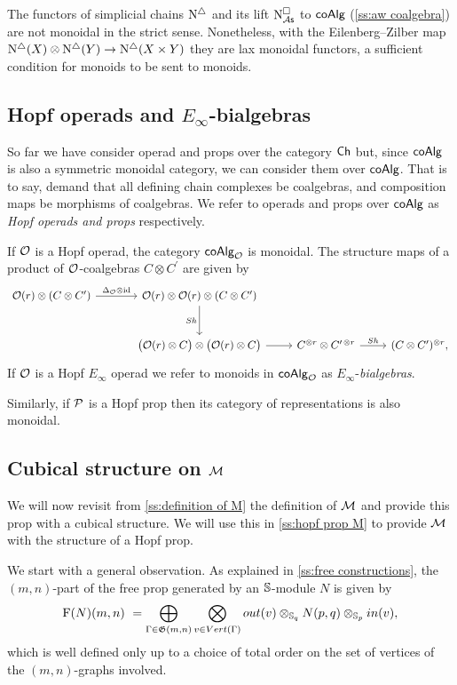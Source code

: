 The functors of simplicial chains $\schains$ and its lift $\cchainsAS$ to $\coAlg$ (\cref{ss:aw coalgebra}) are not monoidal in the strict sense.
Nonetheless, with the Eilenberg--Zilber map $\schains(X) \otimes \schains(Y) \to \schains(X \times Y)$ they are lax monoidal functors, a sufficient condition for monoids to be sent to monoids.

\subsection{Hopf operads and $E_\infty$-bialgebras}

So far we have consider operad and props over the category $\Ch$ but, since $\coAlg$ is also a symmetric monoidal category, we can consider them over $\coAlg$.
That is to say, demand that all defining chain complexes be coalgebras, and composition maps be morphisms of coalgebras.
We refer to operads and props over $\coAlg$ as \textit{Hopf operads and props} respectively.

If $\O$ is a Hopf operad, the category $\coAlg_\O$ is monoidal.
The structure maps of a product of $\O$-coalgebras $C \otimes C^\prime$ are given by
\[
\begin{tikzcd} [column sep = normal, row sep=large]
\O(r) \otimes (C \otimes C^\prime) \arrow[r, "\Delta_\O \otimes \id"] &[10 pt] \O(r) \otimes \O(r) \otimes (C \otimes C^\prime) \arrow[d, "Sh"'] & & \\ &
\big(\O(r) \otimes C \big) \otimes \big( \O(r) \otimes C \big) \arrow[r] & 
C^{\otimes r} \otimes C^{\prime\, \otimes r} \arrow[r, "Sh"] &
(C \otimes C^\prime)^{\otimes r},
\end{tikzcd}
\]
If $\O$ is a Hopf $E_\infty$ operad we refer to monoids in $\coAlg_\O$ as $E_\infty$-\textit{bialgebras}.

Similarly, if $\P$ is a Hopf prop then its category of representations is also monoidal.

\subsection{Cubical structure on $\M$}

We will now revisit from \cref{ss:definition of M} the definition of $\M$ and provide this prop with a cubical structure.
We will use this in \cref{ss:hopf prop M} to provide $\M$ with the structure of a Hopf prop.

We start with a general observation.
As explained in \cref{ss:free constructions}, the $(m,n)$-part of the free prop generated by an $\S$-module $N$ is given by
\[
\F(N)(m,n) \ = \bigoplus_{\Gamma \in \G(m,n)} \bigotimes_{v \in Vert(\Gamma)} out(v) \otimes_{\S_q} N(p, q) \otimes_{\S_p} in(v),
\]
which is well defined only up to a choice of total order on the set of vertices of the $(m,n)$-graphs involved.

